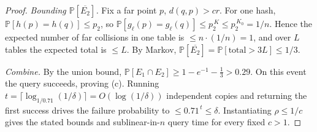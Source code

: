 \documentclass{amsart}
\renewcommand{\Pr}{\mathbb{P}}
\begin{document}
\begin{proof}
\emph{Bounding $\Pr[\overline{E_2}]$.}  Fix a far point $p$, $d(q,p)>cr$.  For one
hash, $\Pr[h(p)=h(q)]\le p_2$, so $\Pr[g_\ell(p)=g_\ell(q)]\le p_2^{\,K}\le
p_2^{\,K_0}=1/n$.  Hence the expected number of far collisions in one table is
$\le n\cdot(1/n)=1$, and over $L$ tables the expected total is $\le L$.  By Markov,
$\Pr[\overline{E_2}]=\Pr[\text{total}>3L]\le 1/3$.

\emph{Combine.}  By the union bound,
$\Pr[E_1\cap E_2]\ge 1-e^{-1}-\tfrac13>0.29$.  On this event the query succeeds,
proving (c).  Running $t=\lceil \log_{1/0.71}(1/\delta)\rceil=O(\log(1/\delta))$
independent copies and returning the first success drives the failure probability to
$\le 0.71^{\,t}\le\delta$.  Instantiating $\rho\le 1/c$ gives the stated bounds and
sublinear-in-$n$ query time for every fixed $c>1$.
\end{proof}
\end{document}
